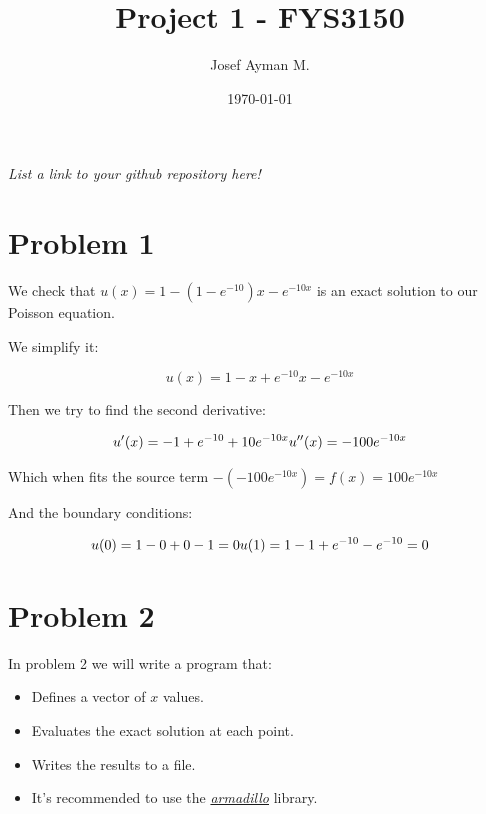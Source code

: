 \documentclass[english,notitlepage]{revtex4-1}  %
\begin{document}
\title{Project 1 - FYS3150}               %
\author{Josef Ayman M.}                      %
\date{\today}                             %
\noaffiliation                            %


\maketitle 
    
\textit{List a link to your github repository here!}
    
\section*{Problem 1}
We check that $u(x) = 1 - (1 - e^{-10}) x - e^{-10 x}$ is an exact solution to our Poisson equation.

We simplify it:

\[
u(x) = 1-x+e^{-10}x-e^{-10x}
\]

Then we try to find the second derivative:

\[
u'(x)=-1+e^{-10}+10e^{-10x} \\
u''(x) =-100e^{-10x}
\]


Which when fits the source term $-(-100e^{-10x}) = f(x) = 100e^{-10x}$

And the boundary conditions:

\[
u(0)=1-0+0-1=0 \\
u(1)=1-1+e^{-10}-e^{-10}=0
\]

\section*{Problem 2}
In problem 2 we will write a program that:

\begin{itemize}
    \item Defines a vector of $x$ values.
    \item Evaluates the exact solution at each point.
    \item Writes the results to a file.
    \item It's recommended to use the \textit{\href{https://arma.sourceforge.net/}{armadillo}} library.
\end{itemize}
\end{document}
